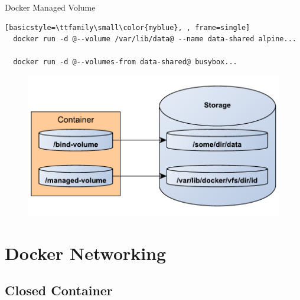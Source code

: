 \begin{frame}[fragile]{Docker Managed Volume }
  \begin{lstlisting}[basicstyle=\ttfamily\small\color{myblue}, , frame=single]
  docker run -d @--volume /var/lib/data@ --name data-shared alpine...

  docker run -d @--volumes-from data-shared@ busybox...
  \end{lstlisting}
  \begin{figure}
    \includegraphics[scale=0.5]{figures/managed-volume.pdf}
  \end{figure}
\end{frame}

\section{Docker Networking}

\subsection{Closed Container}

